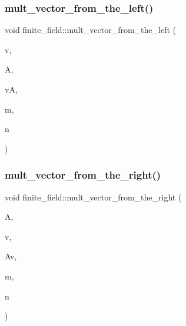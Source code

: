 \subsubsection{\texorpdfstring{mult\+\_\+vector\+\_\+from\+\_\+the\+\_\+left()}{mult\_vector\_from\_the\_left()}}
{\footnotesize\ttfamily void finite\+\_\+field\+::mult\+\_\+vector\+\_\+from\+\_\+the\+\_\+left (\begin{DoxyParamCaption}\item[{\mbox{\hyperlink{galois_8h_a09fddde158a3a20bd2dcadb609de11dc}{I\+NT}} $\ast$}]{v,  }\item[{\mbox{\hyperlink{galois_8h_a09fddde158a3a20bd2dcadb609de11dc}{I\+NT}} $\ast$}]{A,  }\item[{\mbox{\hyperlink{galois_8h_a09fddde158a3a20bd2dcadb609de11dc}{I\+NT}} $\ast$}]{vA,  }\item[{\mbox{\hyperlink{galois_8h_a09fddde158a3a20bd2dcadb609de11dc}{I\+NT}}}]{m,  }\item[{\mbox{\hyperlink{galois_8h_a09fddde158a3a20bd2dcadb609de11dc}{I\+NT}}}]{n }\end{DoxyParamCaption})}

\mbox{\label{classfinite__field_a7a6de59441b867aac84f3f0c711a851a}} 
\subsubsection{\texorpdfstring{mult\+\_\+vector\+\_\+from\+\_\+the\+\_\+right()}{mult\_vector\_from\_the\_right()}}
{\footnotesize\ttfamily void finite\+\_\+field\+::mult\+\_\+vector\+\_\+from\+\_\+the\+\_\+right (\begin{DoxyParamCaption}\item[{\mbox{\hyperlink{galois_8h_a09fddde158a3a20bd2dcadb609de11dc}{I\+NT}} $\ast$}]{A,  }\item[{\mbox{\hyperlink{galois_8h_a09fddde158a3a20bd2dcadb609de11dc}{I\+NT}} $\ast$}]{v,  }\item[{\mbox{\hyperlink{galois_8h_a09fddde158a3a20bd2dcadb609de11dc}{I\+NT}} $\ast$}]{Av,  }\item[{\mbox{\hyperlink{galois_8h_a09fddde158a3a20bd2dcadb609de11dc}{I\+NT}}}]{m,  }\item[{\mbox{\hyperlink{galois_8h_a09fddde158a3a20bd2dcadb609de11dc}{I\+NT}}}]{n }\end{DoxyParamCaption})}

